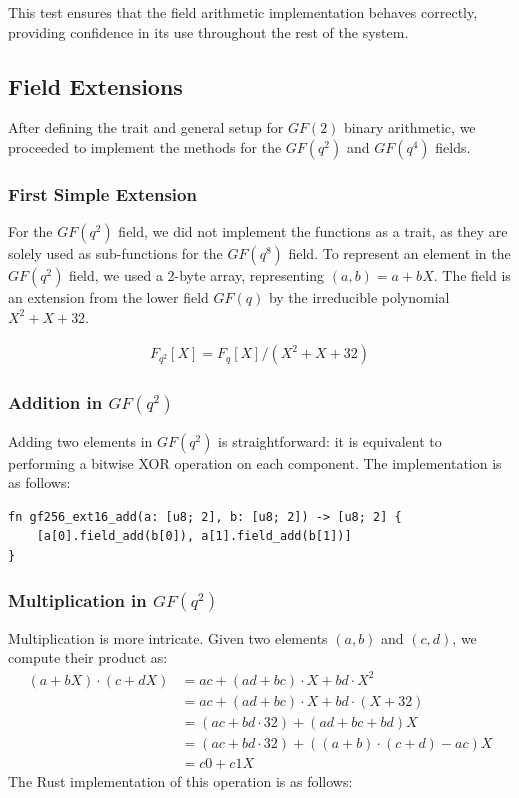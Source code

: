 \documentclass[11pt]{report}
\theoremstyle{definition}
\theoremstyle{plain}
\begin{document}
This test ensures that the field arithmetic implementation behaves correctly, providing confidence in its use throughout the rest of the system.

\subsection{Field Extensions}\label{sub:field_extensions}
After defining the trait and general setup for $GF(2)$ binary arithmetic, we proceeded to implement the methods for the $GF(q^2)$ and $GF(q^4)$ fields.

\subsubsection{First Simple Extension}\label{sub:first_simple_extension}

For the $GF(q^2)$ field, we did not implement the functions as a trait, as they are solely used as sub-functions for the $GF(q^8)$ field. To represent an element in the $GF(q^2)$ field, we used a 2-byte array, representing $(a, b) = a + bX$. The field is an extension from the lower field $GF(q)$ by the irreducible polynomial $X^2 + X + 32$.

\begin{align}
  F_{q^2}[X] = F_q[X] / (X^2 + X + 32)
\end{align}

\subsubsection{Addition in $GF(q^2)$}

Adding two elements in $GF(q^2)$ is straightforward: it is equivalent to performing a bitwise XOR operation on each component. The implementation is as follows:

\begin{verbatim}
fn gf256_ext16_add(a: [u8; 2], b: [u8; 2]) -> [u8; 2] {
    [a[0].field_add(b[0]), a[1].field_add(b[1])]
}
\end{verbatim}

\subsubsection{Multiplication in $GF(q^2)$}

Multiplication is more intricate. Given two elements $(a, b)$ and $(c, d)$, we compute their product as:
\begin{align}
  (a + bX) \cdot (c + dX) & = ac + (ad + bc) \cdot X + bd \cdot X^2              \\
                          & = ac + (ad + bc) \cdot X + bd \cdot (X + 32)         \\
                          & = (ac + bd \cdot 32) + (ad + bc + bd)X               \\
                          & = (ac + bd \cdot 32) + ((a + b) \cdot (c + d) - ac)X \\
                          & = c0 + c1X
\end{align}
The Rust implementation of this operation is as follows:
\end{document}
